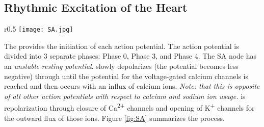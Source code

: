 \documentclass[../Bio_chemistryReview.tex]{subfiles}
\begin{document}
\subsection{Rhythmic Excitation of the Heart}
\begin{wrapfigure}{r}{0.5\textwidth}
  \centering
  \vspace{-11pt}
  \texttt{[image: SA.jpg]}
  \caption{The Pacemaker Potential of the SA Node}
  \label{fig:SA}
\end{wrapfigure}
The  provides the initiation of each action
potential. The action potential is divided into 3 separate phases: Phase 0,
Phase 3, and Phase 4. The SA node has an \textit{unstable resting potential}.
 slowly depolarizes (the potential becomes less negative)
through  until the potential for the voltage-gated
calcium channels is reached and then  occurs with an influx of
calcium ions. \textit{Note: that this is opposite of all other action potentials
with respect to calcium and sodium ion usage.}  is
repolarization through closure of Ca\textsuperscript{2+} channels and opening of
K\textsuperscript{+} channels for the outward flux of those ions. Figure
\ref{fig:SA} summarizes the process.\par
\end{document}
